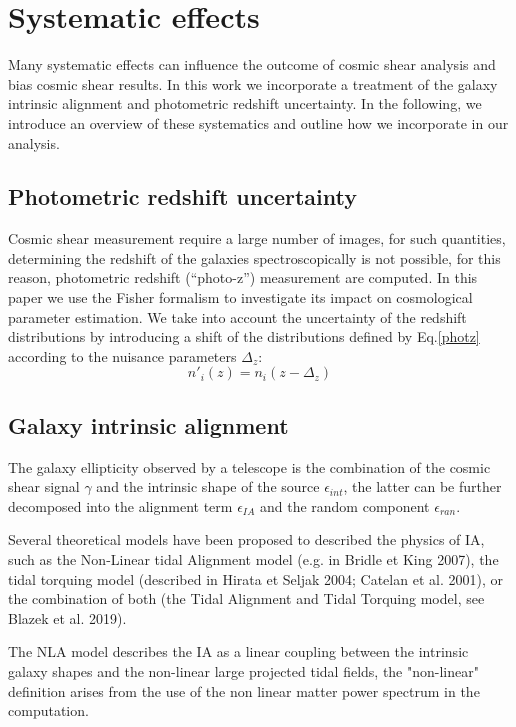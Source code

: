\documentclass[twocolumn,twocolappendix]{aastex63}
\begin{document}
\section{Systematic effects}
Many systematic effects can influence the outcome of cosmic shear analysis and bias cosmic shear results. 
In this work we incorporate a treatment of the galaxy intrinsic alignment and photometric redshift uncertainty.
In the following, we introduce an overview of these systematics and outline how we incorporate in our analysis.

\subsection{Photometric redshift uncertainty}
Cosmic shear measurement require a large number of images, for such quantities, determining the redshift of the galaxies spectroscopically is not possible, for this reason, photometric redshift (``photo-z'') measurement are computed.
In this paper we use the Fisher formalism to investigate its impact on cosmological parameter estimation.
 We take into account the uncertainty of the redshift distributions by introducing  a shift of the distributions defined by Eq.\ref{photz} according to the nuisance parameters $\Delta_z$:
 \begin{equation}
     n'_i(z)= n_i(z-\Delta_z)
 \end{equation}

\subsection{Galaxy intrinsic alignment}

The galaxy ellipticity observed by a telescope is the combination of the cosmic shear signal $\gamma$ and the intrinsic shape of the source $\epsilon_{int}$, the latter can be further decomposed into the alignment term $\epsilon_{IA}$ and the random component $\epsilon_{ran}$. 

Several theoretical models have been proposed to described the physics of IA, such as the Non-Linear tidal Alignment model (e.g. in Bridle et King 2007), the tidal torquing model (described in Hirata et Seljak 2004; Catelan et al. 2001), or the combination of both (the Tidal Alignment and Tidal Torquing model, see Blazek et al. 2019).

The NLA model describes the IA as a linear coupling between the intrinsic galaxy shapes and the non-linear large projected tidal fields, the "non-linear" definition arises from the use of the non linear matter power spectrum in the computation. 
\end{document}
